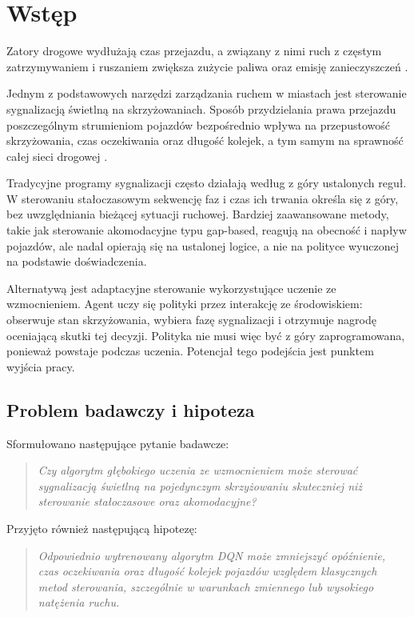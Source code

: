 \clearpage
\section{Wstęp}
\label{sec:wstep}

\label{subsec:wprowadzenie}

Zatory drogowe wydłużają czas przejazdu, a związany z nimi ruch z częstym zatrzymywaniem i ruszaniem zwiększa zużycie paliwa oraz emisję zanieczyszczeń \cite{treiber2008congestion}.

Jednym z podstawowych narzędzi zarządzania ruchem w miastach jest sterowanie sygnalizacją świetlną na skrzyżowaniach. Sposób przydzielania prawa przejazdu poszczególnym strumieniom pojazdów bezpośrednio wpływa na przepustowość skrzyżowania, czas oczekiwania oraz długość kolejek, a tym samym na sprawność całej sieci drogowej \cite{LEITNER2022507}.

Tradycyjne programy sygnalizacji często działają według z góry ustalonych reguł. W sterowaniu stałoczasowym sekwencję faz i czas ich trwania określa się z góry, bez uwzględniania bieżącej sytuacji ruchowej. Bardziej zaawansowane metody, takie jak sterowanie akomodacyjne typu gap-based, reagują na obecność i napływ pojazdów, ale nadal opierają się na ustalonej logice, a nie na polityce wyuczonej na podstawie doświadczenia.

Alternatywą jest adaptacyjne sterowanie wykorzystujące uczenie ze wzmocnieniem. Agent uczy się polityki przez interakcję ze środowiskiem: obserwuje stan skrzyżowania, wybiera fazę sygnalizacji i otrzymuje nagrodę oceniającą skutki tej decyzji. Polityka nie musi więc być z góry zaprogramowana, ponieważ powstaje podczas uczenia. Potencjał tego podejścia jest punktem wyjścia pracy.

\subsection{Problem badawczy i hipoteza}
\label{subsec:problem-hipoteza}

Sformułowano następujące pytanie badawcze:
\begin{quote}
    \emph{Czy algorytm głębokiego uczenia ze wzmocnieniem może sterować sygnalizacją świetlną na pojedynczym skrzyżowaniu skuteczniej niż sterowanie stałoczasowe oraz akomodacyjne?}
\end{quote}

Przyjęto również następującą hipotezę:
\begin{quote}
    \emph{Odpowiednio wytrenowany algorytm DQN może zmniejszyć opóźnienie, czas oczekiwania oraz długość kolejek pojazdów względem klasycznych metod sterowania, szczególnie w warunkach zmiennego lub wysokiego natężenia ruchu.}
\end{quote}


